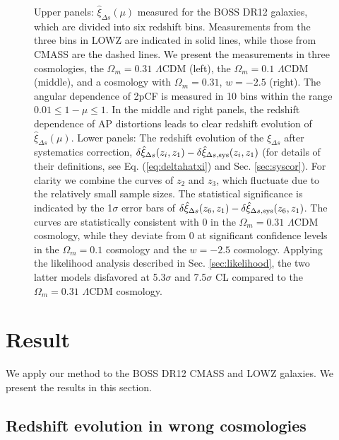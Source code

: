 \documentclass[iop]{emulateapj}
\begin{document}
\begin{figure}
   \caption{\label{fig_TpCF}
   Upper panels: $\hat \xi_{\Delta s}(\mu)$ measured for the BOSS DR12 galaxies,
   which are divided into six redshift bins.
   Measurements from the three bins in LOWZ are indicated in solid lines, 
   while those from CMASS are the dashed lines.
   We present the measurements in three cosmologies,
   the $\Omega_m=0.31$ $\Lambda$CDM (left), the $\Omega_m=0.1$ $\Lambda$CDM (middle),
   and a cosmology with $\Omega_m=0.31$, $w=-2.5$ (right).   
   The angular dependence of 2pCF is measured in 10 bins within the range $0.01\leq1-\mu\leq1$.
   In the middle and right panels, the redshift dependence of AP distortions leads to clear redshift evolution of $\hat \xi_{\Delta s}(\mu)$.
   Lower panels: The redshift evolution of the $\hat\xi_{\Delta s}$ after systematics correction,  
   $\delta\hat \xi_{\Delta s}(z_i,z_1)-\delta\hat \xi_{\Delta s,\rm sys}(z_i,z_1)$
   (for details of their definitions, see Eq. (\ref{eq:deltahatxi}) and Sec. \ref{sec:syscor}).
   For clarity we combine the curves of $z_2$ and $z_3$, which fluctuate
   due to the relatively small sample sizes.
   The statistical significance is indicated by the 1$\sigma$ error bars of $\delta\hat \xi_{\Delta s}(z_6,z_1)-\delta\hat \xi_{\Delta s,\rm sys}(z_6,z_1)$.
   The curves are statistically consistent with 0 in the $\Omega_m=0.31$ $\Lambda$CDM cosmology,
    while they deviate from 0 at significant confidence levels in the $\Omega_m=0.1$ cosmology and the $w=-2.5$ cosmology.
   Applying the likelihood analysis described in Sec. \ref{sec:likelihood},
    the two latter models disfavored at 5.3$\sigma$ and 7.5$\sigma$ CL compared to the $\Omega_m=0.31$ $\Lambda$CDM cosmology.
   }
\end{figure}

\section{Result}

We apply our method to the BOSS DR12 CMASS and LOWZ galaxies.
We present the results in this section.

\subsection{Redshift evolution in wrong cosmologies}\label{sec:redevolvxi}
\end{document}
